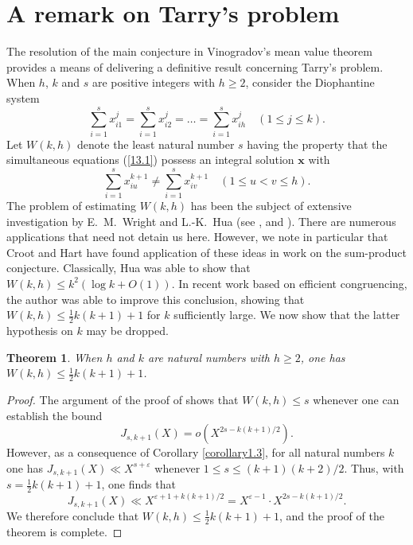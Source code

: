 \documentclass[12pt,reqno]{amsart}
\newtheorem{theorem}{Theorem}[section]
\theoremstyle{definition}
\theoremstyle{remark}
\numberwithin{equation}{section}
\def\bfx{{\mathbf x}}
\def\eps{\varepsilon}
\def\le{\leqslant} \def\ge{\geqslant} \def\pleq{\preccurlyeq} \def\ple{\prec}
\begin{document}
\section{A remark on Tarry's problem} The resolution of the main conjecture in Vinogradov's 
mean value theorem provides a means of delivering a definitive result concerning Tarry's 
problem. When $h$, $k$ and $s$ are positive integers with $h\ge 2$, consider the 
Diophantine system
\begin{equation}\label{13.1}
\sum_{i=1}^sx_{i1}^j=\sum_{i=1}^sx_{i2}^j=\ldots =\sum_{i=1}^sx_{ih}^j\quad 
(1\le j\le k).
\end{equation}
Let $W(k,h)$ denote the least natural number $s$ having the property that the simultaneous 
equations (\ref{13.1}) possess an integral solution $\bfx$ with
$$\sum_{i=1}^sx_{iu}^{k+1}\ne \sum_{i=1}^sx_{iv}^{k+1}\quad (1\le u<v\le h).$$
The problem of estimating $W(k,h)$ has been the subject of extensive investigation by 
E.~M.~Wright and L.-K.~Hua (see \cite{Hua1938}, \cite{Hua1949} and \cite{Wri1948}). 
There are numerous applications that need not detain us here. However, we note in 
particular that Croot and Hart \cite{CH2010} have found application of these ideas in work 
on the sum-product conjecture. Classically, Hua \cite{Hua1949} was able to show that 
$W(k,h)\le k^2(\log k+O(1))$. In recent work \cite[Theorem 12.1]{Woo2017} based on 
efficient congruencing, the author was able to improve this conclusion, showing that 
$W(k,h)\le \tfrac{1}{2}k(k+1)+1$ for $k$ sufficiently large. We now show that the latter 
hypothesis on $k$ may be dropped.

\begin{theorem}\label{theorem13.1} When $h$ and $k$ are natural numbers with $h\ge 2$, 
one has $W(k,h)\le \tfrac{1}{2}k(k+1)+1$.
\end{theorem}

\begin{proof} The argument of the proof of \cite[Theorem 1.3]{Woo2012} shows that 
$W(k,h)\le s$ whenever one can establish the bound
$$J_{s,k+1}(X)=o(X^{2s-k(k+1)/2}).$$
However, as a consequence of Corollary \ref{corollary1.3}, for all natural numbers $k$ one 
has $J_{s,k+1}(X)\ll X^{s+\eps}$ whenever $1\le s\le (k+1)(k+2)/2$. Thus, with 
$s=\tfrac{1}{2}k(k+1)+1$, one finds that
$$J_{s,k+1}(X)\ll X^{\eps+1+k(k+1)/2}=X^{\eps-1}\cdot X^{2s-k(k+1)/2}.$$
We therefore conclude that $W(k,h)\le \tfrac{1}{2}k(k+1)+1$, and the proof of the theorem 
is complete.
\end{proof}
\end{document}
